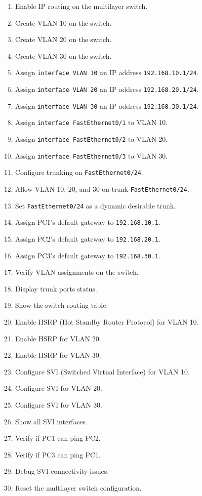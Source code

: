 \documentclass[a4paper]{book}
\begin{document}
\begin{enumerate}
    \item Enable IP routing on the multilayer switch.
    \item Create VLAN 10 on the switch.
    \item Create VLAN 20 on the switch.
    \item Create VLAN 30 on the switch.
    \item Assign \texttt{interface VLAN 10} an IP address \texttt{192.168.10.1/24}.
    \item Assign \texttt{interface VLAN 20} an IP address \texttt{192.168.20.1/24}.
    \item Assign \texttt{interface VLAN 30} an IP address \texttt{192.168.30.1/24}.
    \item Assign \texttt{interface FastEthernet0/1} to VLAN 10.
    \item Assign \texttt{interface FastEthernet0/2} to VLAN 20.
    \item Assign \texttt{interface FastEthernet0/3} to VLAN 30.
    \item Configure trunking on \texttt{FastEthernet0/24}.
    \item Allow VLAN 10, 20, and 30 on trunk \texttt{FastEthernet0/24}.
    \item Set \texttt{FastEthernet0/24} as a dynamic desirable trunk.
    \item Assign PC1's default gateway to \texttt{192.168.10.1}.
    \item Assign PC2's default gateway to \texttt{192.168.20.1}.
    \item Assign PC3's default gateway to \texttt{192.168.30.1}.
    \item Verify VLAN assignments on the switch.
    \item Display trunk ports status.
    \item Show the switch routing table.
    \item Enable HSRP (Hot Standby Router Protocol) for VLAN 10.
    \item Enable HSRP for VLAN 20.
    \item Enable HSRP for VLAN 30.
    \item Configure SVI (Switched Virtual Interface) for VLAN 10.
    \item Configure SVI for VLAN 20.
    \item Configure SVI for VLAN 30.
    \item Show all SVI interfaces.
    \item Verify if PC1 can ping PC2.
    \item Verify if PC3 can ping PC1.
    \item Debug SVI connectivity issues.
    \item Reset the multilayer switch configuration.
\end{enumerate}
\end{document}
